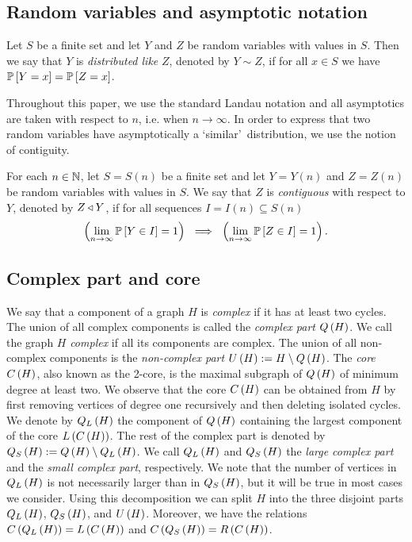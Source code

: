 \subsection{Random variables and asymptotic notation}
\begin{definition}
	Let $S$ be a finite set and let $Y$ and $Z$ be random variables with values in $S$. Then we say that $Y$ is {\em distributed like} $Z$, denoted by $Y\sim Z$, if for all $x \in S$ we have $\mathbb{P}\left[Y=x\right]=\mathbb{P}\left[Z=x\right]$.
\end{definition}
Throughout this paper, we use the standard Landau notation and all asymptotics are taken with respect to $n$, i.e. when $n\to \infty$. In order to express that two random variables have asymptotically a \lq similar\rq\ distribution, we use the notion of contiguity.
\begin{definition}
	For each $n\in\mathbb{N}$, let $S=S(n)$ be a finite set and let $Y=Y(n)$ and $Z=Z(n)$ be random variables with values in $S$. We say that $Z$ is {\em contiguous} with respect to $Y$, denoted by $Z \triangleleft Y$, if for all sequences $I=I(n)\subseteq S(n)$
	\begin{align*}
		\left(\lim\limits_{n\to \infty}\mathbb{P}\left[Y\in I\right]=1\right) ~\implies~ \left(\lim\limits_{n\to \infty}\mathbb{P}\left[Z\in I\right]=1\right).
	\end{align*}
\end{definition}

\subsection{Complex part and core}\label{MDsub:decomposition}
We say that a component of a graph $H$ is {\em complex} if it has at least two cycles. The union of all complex components is called the {\em complex part} $Q\left(H\right)$. We call the graph $H$ {\em complex} if all its components are complex. The union of all non-complex components is the {\em non-complex part} $U\left(H\right):=H\setminus Q\left(H\right)$. The {\em core} $C\left(H\right)$, also known as the 2-core, is the maximal subgraph of $Q\left(H\right)$ of minimum degree at least two. We observe that the core $C\left(H\right)$ can be obtained from $H$ by first removing vertices of degree one recursively and then deleting isolated cycles. We denote by $Q_L\left(H\right)$ the component of $Q\left(H\right)$ containing the largest component of the core $L\left(C\left(H\right)\right)$. The rest of the complex part is denoted by $Q_S\left(H\right):=Q\left(H\right)\setminus Q_L\left(H\right)$. We call $Q_L\left(H\right)$ and $Q_S\left(H\right)$ the {\em large complex part} and the {\em small complex part}, respectively. We note that the number of vertices in $Q_L\left(H\right)$ is not necessarily larger than in $Q_S\left(H\right)$, but it will be true in most cases we consider. Using this decomposition we can split $H$ into the three disjoint parts $Q_L\left(H\right)$, $Q_S\left(H\right)$, and $U\left(H\right)$. Moreover, we have the relations $C\left(Q_L\left(H\right)\right)=L\left(C\left(H\right)\right)$ and $C\left(Q_S\left(H\right)\right)=R\left(C\left(H\right)\right)$.

